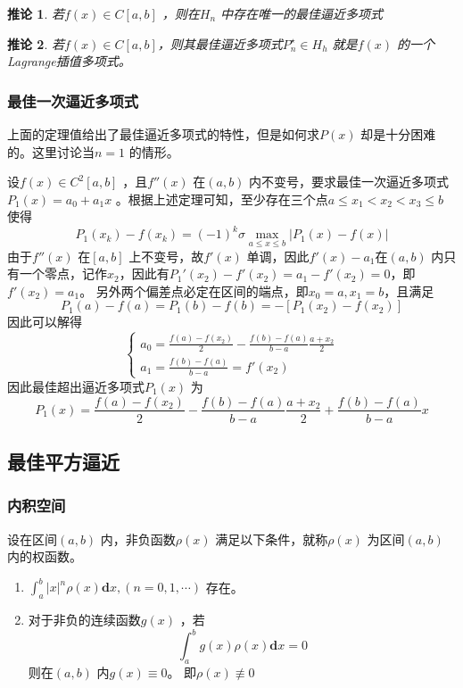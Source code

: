 \documentclass[a4paper]{article}
\begin{document}
\newtheorem{inference}{推论}
\begin{inference}
	若$f(x) \in C[a,b]$ ，则在$H_n$ 中存在唯一的最佳逼近多项式
\end{inference}
\begin{inference}
	若$f(x) \in C[a,b]$，则其最佳逼近多项式$P_n^{\star} \in H_h$ 就是$f(x)$ 的一个Lagrange插值多项式。
\end{inference}

\subsubsection{最佳一次逼近多项式}
上面的定理值给出了最佳逼近多项式的特性，但是如何求$P(x)$ 却是十分困难的。这里讨论当$n=1$ 的情形。

设$f(x) \in C^2[a,b]$ ，且$f''(x)$ 在$(a,b)$ 内不变号，要求最佳一次逼近多项式$P_1(x) = a_0 + a_1 x$ 。根据上述定理可知，至少存在三个点$a \le x_1 < x_2 < x_3 \le b$ 使得
\[
	P_1(x_{k}) - f(x_{k}) = (-1)^{k} \sigma \max_{a \le x \le b} |P_1(x) - f(x)|
\] 
由于$f''(x)$ 在$[a,b]$ 上不变号，故$f'(x)$ 单调，因此$f'(x) - a_1$在$(a,b)$ 内只有一个零点，记作$x_2$，因此有$P_1'(x_2) - f'(x_2) = a_1 - f'(x_2) = 0$，即$f'(x_2) = a_1$。
另外两个偏差点必定在区间的端点，即$x_0 = a, x_1 = b$，且满足
\[
	P_1(a) - f(a) = P_1(b) - f(b) = - [P_1(x_2) - f(x_2)]
\] 
因此可以解得
\[
	\begin{cases}
a_0 = \frac{f(a) - f(x_2)}{2} - \frac{f(b) - f(a)}{b - a} \frac{a + x_2}{2} \\
a_1 = \frac{f(b) - f(a)}{b - a} = f'(x_2)
	\end{cases}
\] 
因此最佳超出逼近多项式$P_1(x)$ 为
\[
P_1(x) = \frac{f(a) - f(x_2)}{2} - \frac{f(b) - f(a)}{b - a} \frac{a + x_2}{2} + \frac{f(b) - f(a)}{b - a} x 
\] 

\subsection{最佳平方逼近}
\subsubsection{内积空间}
\begin{definition}
	设在区间$(a,b)$ 内，非负函数$\rho(x)$ 满足以下条件，就称$\rho(x)$ 为区间$(a,b)$ 内的权函数。
	\begin{enumerate}
		\item $\int_{a}^{b} |x|^{n} \rho(x) \mathbf{d} x, (n=0,1,\cdots)$ 存在。
		\item 对于非负的连续函数$g(x)$ ，若
			\[
				\int_{a}^{b} g(x) \rho(x) \mathbf{d} x = 0
			\] 
			则在$(a,b)$ 内$g(x) \equiv 0$。
			即$\rho(x) \not\equiv 0$
	\end{enumerate}
\end{definition}
\end{document}
